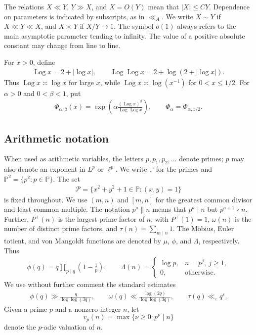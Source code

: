 \documentclass[12pt,reqno]{amsart}
\numberwithin{equation}{section}
\theoremstyle{definition}
\theoremstyle{remark}
\newcommand{\Log}{\operatorname{Log}}
\begin{document}
The relations $X\ll Y$, $Y\gg X$, and $X=O(Y)$ mean that
$|X|\leq CY$.  Dependence on parameters is indicated by subscripts,
as in $\ll_A$.  We write $X\sim Y$ if $X\ll Y\ll X$, and
$X\asymp Y$ if $X/Y\to1$.  The symbol $o(1)$ always refers to the main
asymptotic parameter tending to infinity.  The value of a positive
absolute constant may change from line to line.

For $x>0$, define
\begin{align}\label{e:Lognotation}
 \Log x=2+|\log x|,
 \qquad
 \Log\Log x=2+\log(2+|\log x|).
\end{align}
Thus $\Log x\asymp\log x$ for large $x$, while
$\Log x\asymp\log(x^{-1})$ for $0<x\leq1/2$.  For
$\alpha>0$ and $0<\beta<1$, put
\begin{align}\label{e:defPhi}
 \Phi_{\alpha,\beta}(x)
 =\exp\left(\alpha\frac{(\Log x)^\beta}{\Log\Log x}\right),
 \qquad \Phi_\alpha=\Phi_{\alpha,1/2}.
\end{align}

\subsection{Arithmetic notation}

When used as arithmetic variables, the letters \(p,p_1,p_2,\ldots\) denote primes; \(p\) may also denote an exponent in \(L^p\) or \(\ell^p\).  We write
$\mathbb P$ for the primes and $\mathbb P^2=\{p^2:p\in\mathbb P\}$.
The set
\begin{align}\label{e:defcalP}
 \mathcal P=\{x^2+y^2+1\in\mathbb P:(x,y)=1\}
\end{align}
is fixed throughout.  We use $(m,n)$ and $[m,n]$ for the greatest
common divisor and least common multiple.  The notation
$p^a\parallel n$ means that $p^a\mid n$ but $p^{a+1}\nmid n$.
Further, $P^+(n)$ is the largest prime factor of $n$, with
$P^+(1)=1$, $\omega(n)$ is the number of distinct prime factors, and
$\tau(n)=\sum_{m\mid n}1$. 
The M\"obius, Euler totient, and von Mangoldt functions are denoted by
$\mu$, $\phi$, and $\Lambda$, respectively.  Thus
\begin{align*}
 \phi(q)=q\prod_{p\mid q}\left(1-\frac1p\right),
 \qquad
 \Lambda(n)=\begin{cases}\log p,&n=p^j,\ j\geq1,\\0,&\text{otherwise}.
 \end{cases}
\end{align*}
We use without further comment the standard estimates
\begin{align}\label{e:totient}
 \phi(q)\gg\frac q{\log\log(3q)},\qquad
 \omega(q)\ll\frac{\log(2q)}{\log\log(3q)},\qquad
 \tau(q)\ll_\varepsilon q^\varepsilon.
\end{align}
Given a prime \(p\) and a nonzero integer \(n\), let
\[
 v_p(n)=\max\{\nu\geq0:p^\nu\mid n\}
\]
denote the \(p\)-adic valuation of \(n\).
\end{document}
